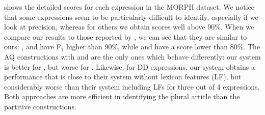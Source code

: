 \documentclass[output=paper,modfonts]{langscibook}
\begin{document}
 shows the detailed scores for each expression in the MORPH dataset. We notice that some expressions seem to be particularly difficult to identify, especially if we look at precision, whereas for others we obtain scores well above 90\%. 
When we compare our results to those reported by \citet{nasr:acl:2015}, we can see that they are similar to ours: ,  and  have F$_1$ higher than 90\%, while  and  have a score lower than 80\%.  The AQ constructions with  and  are the only ones which behave differently: our system is better for , but worse for .
Likewise, for DD expressions, our system obtains a performance that is close to their system without lexicon features (LF), but considerably worse than their system including LFs for three out of 4 expressions. Both approaches are more efficient in identifying the plural article  than the partitive constructions. %
\end{document}
